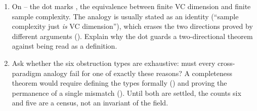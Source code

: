 \begin{enumerate}[leftmargin=*,itemsep=3pt]
\item On -- the dot marks
, the equivalence between finite VC dimension and
finite sample complexity. The analogy is usually stated as an identity
(``sample complexity just \emph{is} VC dimension''), which erases the two
directions proved by different arguments (). Explain why the
dot guards a two-directional theorem against being read as a definition.

\item Ask whether the six obstruction types are exhaustive: must every
cross-paradigm analogy fail for one of exactly these reasons? A completeness
theorem would require defining the types formally
() and proving the permanence of a single mismatch
(). Until both are settled, the counts six
and five are a census, not an invariant of the field.
\end{enumerate}
